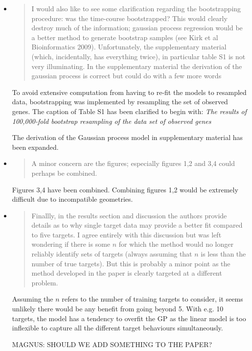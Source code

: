 \documentclass{article}
\begin{document}
\begin{itemize}
\item \begin{quote} I would also like to see some clarification
    regarding the bootstrapping procedure: was the time-course
    bootstrapped? This would clearly destroy much of the information;
    gaussian process regression would be a better method to generate
    bootstrap samples (see Kirk et al Bioinformatics
    2009). Unfortunately, the supplementary material (which,
    incidentally, has everything twice), in particular table S1 is not
    very illuminating. In the supplementary material the derivation of
    the gaussian process is correct but could do with a few more words
  \end{quote}

To avoid extensive computation from having to re-fit the models to
resampled data, bootstrapping was implemented by resampling the set
of observed genes.  The caption of Table S1 has been clarified
to begin with:
\emph{The results of 100,000-fold bootstrap resampling of
the data set of observed genes}

The derivation of the Gaussian process model in supplementary material
has been expanded.

\item \begin{quote} A minor concern are the figures; especially
    figures 1,2 and 3,4 could perhaps be combined.
  \end{quote}

  Figures 3,4 have been combined. Combining figures 1,2 would be
  extremely difficult due to incompatible geometries.

\item \begin{quote} Finallly, in the results section and discussion
    the authors provide details as to why single target data may
    provide a better fit compared to five targets. I agree entirely
    with this discussion but was left wondering if there is some $n$
    for which the method would no longer reliably identify sets of
    targets (always assuming that $n$ is less than the number of true
    targets). But this is probably a minor point as the method
    developed in the paper is clearly targeted at a different problem.
  \end{quote}

  Assuming the $n$ refers to the number of training targets to
  consider, it seems unlikely there would be any benefit from going
  beyond 5.  With e.g. 10 targets, the model has a tendency to overfit
  the GP as the linear model is too inflexible to capture all the
  different target behaviours simultaneously.

  MAGNUS: SHOULD WE ADD SOMETHING TO THE PAPER?

\end{itemize}
\end{document}
